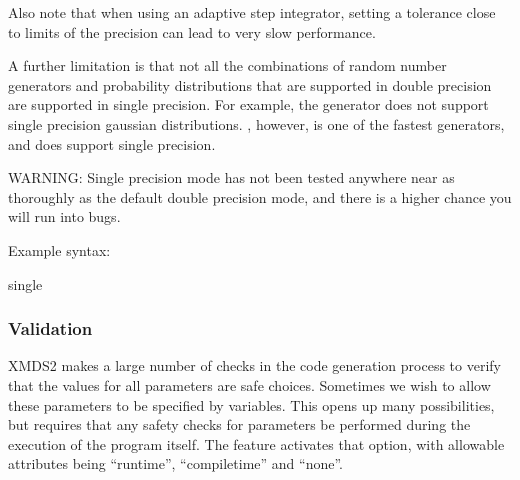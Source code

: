 \documentclass[letterpaper,10pt,english]{sphinxmanual}
\begin{document}
\sphinxAtStartPar
Also note that when using an adaptive step integrator, setting a tolerance close to limits of the precision can lead to very slow performance.

\sphinxAtStartPar
A further limitation is that not all the combinations of random number generators and probability distributions that are supported in double precision are supported in single precision. For example, the  generator does not support single precision gaussian distributions. , however, is one of the fastest generators, and does support single precision.

\sphinxAtStartPar
WARNING: Single precision mode has not been tested anywhere near as thoroughly as the default double precision mode, and there is a higher chance you will run into bugs.

\sphinxAtStartPar
Example syntax:

\begin{sphinxVerbatim}[commandchars=\\\{\}]
 
         single 
\end{sphinxVerbatim}

\ignorespaces 

\subsubsection{Validation}
\label{\detokenize{reference_elements:validation}}\label{\detokenize{reference_elements:index-22}}\label{\detokenize{reference_elements:id7}}
\sphinxAtStartPar
XMDS2 makes a large number of checks in the code generation process to verify that the values for all parameters are safe choices.  Sometimes we wish to allow these parameters to be specified by variables.  This opens up many possibilities, but requires that any safety checks for parameters be performed during the execution of the program itself.  The  feature activates that option, with allowable attributes being “run\sphinxhyphen{}time”, “compile\sphinxhyphen{}time” and “none”.
\end{document}
